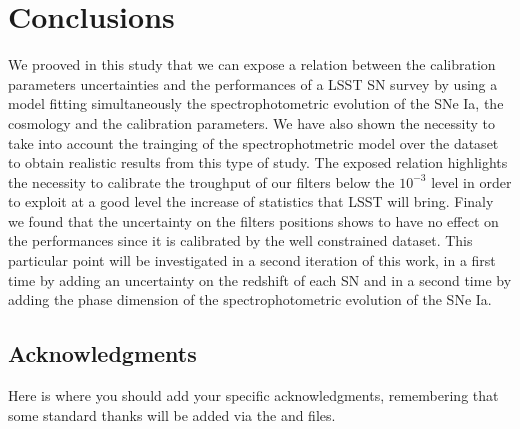 \documentclass[\docopts]{\docclass}
\begin{document}

\section{Conclusions}
\label{sec::conclusions}

We prooved in this study that we can expose a relation between the calibration  parameters uncertainties and the performances of a LSST SN survey by using a model fitting simultaneously the spectrophotometric evolution of the SNe Ia, the cosmology and the calibration parameters.
We have also shown the necessity to take into account the trainging of the spectrophotmetric model over the dataset to obtain realistic results from this type of study.
The exposed relation highlights the necessity to calibrate the troughput of our filters below the $10^{-3}$ level in order to exploit at a good level the increase of statistics that LSST will bring.
Finaly we found that the uncertainty on the filters positions shows to have no effect on the performances since it is calibrated by the well constrained dataset. This particular point will be investigated in a second iteration of this work, in a first time by adding an uncertainty on the redshift of each SN and in a second time by adding the phase dimension of the spectrophotometric evolution of the SNe Ia.



\subsection*{Acknowledgments}

Here is where you should add your specific acknowledgments, remembering that some standard thanks will be added via the  and  files.







\end{document}

